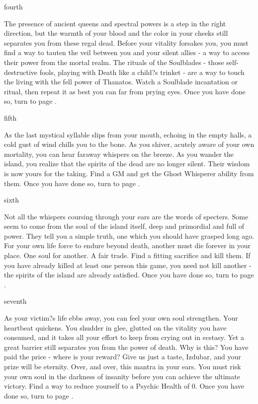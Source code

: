 \documentclass[greennotebook]{Kos}
\begin{document}
\begin{page}{fourth}

The presence of ancient queens and spectral powers is a step in the right direction, but the warmth of your blood and the color in your cheeks still separates you from these regal dead. Before your vitality forsakes you, you must find a way to tauten the veil between you and your silent allies - a way to access their power from the mortal realm. The rituals of the Soulblades - those self-destructive fools, playing with Death like a child?s trinket - are a way to touch the living with the fell power of Thanatos. Watch a Soulblade incantation or ritual, then repeat it as best you can far from prying eyes. Once you have done so, turn to page .

\end{page}

\begin{page}{fifth}

As the last mystical syllable slips from your mouth, echoing in the empty halls, a cold gust of wind chills you to the bone. As you shiver, acutely aware of your own mortality, you can hear faraway whispers on the breeze. As you wander the island, you realize that the spirits of the dead are no longer silent. Their wisdom is now yours for the taking. Find a GM and get the Ghost Whisperer ability from them. Once you have done so, turn to page .

\end{page}

\begin{page}{sixth}

Not all the whispers coursing through your ears are the words of specters. Some seem to come from the soul of the island itself, deep and primordial and full of power. They tell you a simple truth, one which you should have grasped long ago. For your own life force to endure beyond death, another must die forever in your place. One soul for another. A fair trade. Find a fitting sacrifice and kill them. If you have already killed at least one person this game, you need not kill another - the spirits of the island are already satisfied. Once you have done so, turn to page .

\end{page}

\begin{page}{seventh}

As your victim?s life ebbs away, you can feel your own soul strengthen. Your heartbeat quickens. You shudder in glee, glutted on the vitality you have consumed, and it takes all your effort to keep from crying out in ecstasy. Yet a great barrier still separates you from the power of death. Why is this? You have paid the price - where is your reward? Give us just a taste, Izdubar, and your prize will be eternity. Over, and over, this mantra in your ears. You must risk your own soul in the darkness of insanity before you can achieve the ultimate victory. Find a way to reduce yourself to a Psychic Health of 0. Once you have done so, turn to page .

\end{page}
\end{document}

